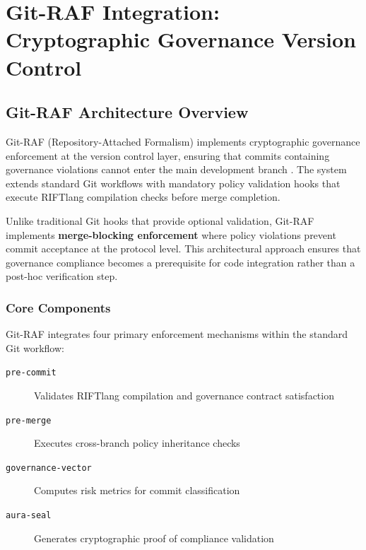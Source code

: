 \chapter{Git-RAF Integration: Cryptographic Governance Version Control}
\label{ch:gitraf-integration}

\section{Git-RAF Architecture Overview}

Git-RAF (Repository-Attached Formalism) implements cryptographic governance enforcement at the version control layer, ensuring that commits containing governance violations cannot enter the main development branch \cite{gitraf2023spec}. The system extends standard Git workflows with mandatory policy validation hooks that execute RIFTlang compilation checks before merge completion.

Unlike traditional Git hooks that provide optional validation, Git-RAF implements \textbf{merge-blocking enforcement} where policy violations prevent commit acceptance at the protocol level. This architectural approach ensures that governance compliance becomes a prerequisite for code integration rather than a post-hoc verification step.

\subsection{Core Components}

Git-RAF integrates four primary enforcement mechanisms within the standard Git workflow:

\begin{description}
\item[\texttt{pre-commit}] Validates RIFTlang compilation and governance contract satisfaction
\item[\texttt{pre-merge}] Executes cross-branch policy inheritance checks
\item[\texttt{governance-vector}] Computes risk metrics for commit classification
\item[\texttt{aura-seal}] Generates cryptographic proof of compliance validation
\end{description}

